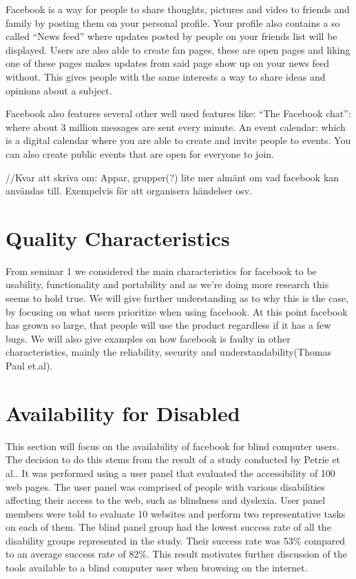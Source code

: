 \documentclass[conference]{IEEEtran}
\begin{document}
Facebook is a way for people to share thoughts, pictures and video to friends
and family by posting them on your personal profile. Your profile also contains
a so called “News feed” where updates posted by people on your friends list
will be displayed. Users are also able to create fan pages, these are open
pages and liking one of these pages makes updates from said page show up on
your news feed without. This gives people with the same interests a way to
share ideas and opinions about a subject.


Facebook also features several other well used features like:
“The Facebook chat”: where about  3 million messages are sent every minute.
An event calendar: which is a digital calendar where you are able to create and
invite people to events. You can also create public events that are open for
everyone to join.

//Kvar att skriva om: Appar, grupper(?) lite mer almänt om vad facebook kan
användas till. Exempelvis för att organisera händelser osv.  


\section{Quality Characteristics}
\label{quality}
From seminar 1 we considered the main characteristics for facebook to be
usability, functionality and portability and as we’re doing more research this
seems to hold true. We will give further understanding as to why this is the
case, by focusing on what users prioritize when using facebook. At this point
facebook has grown so large, that people will use the product regardless if it
has a few bugs. We will also give examples on how facebook is faulty in other
characteristics, mainly the reliability, security and understandability(Thomas
Paul et.al).


\section{Availability for Disabled}
\label{availability}


This section will focus on the availability of facebook for blind computer
users. The decision to do this stems from the result of a study conducted by
Petrie et al.\cite{petrie2004}. It was performed using a user panel that
evaluated the accessibility of 100 web pages.  The user panel was comprised of
people with various disabilities affecting their access to the web, such as
blindness and dyslexia. User panel members were told to evaluate 10 websites
and perform two representative tasks on each of them. The blind panel group had
the lowest success rate of all the disability groups represented in the study.
Their success rate was 53\% compared to an average success rate of 82\%.  This
result motivates further discussion of the tools available to a blind computer
user when browsing on the internet.
\end{document}
